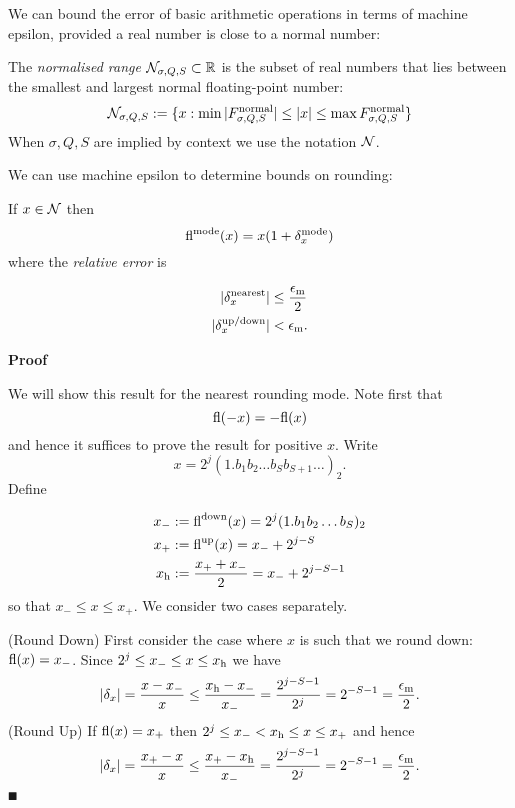 We can bound the error of basic arithmetic operations in terms of machine epsilon, provided a real number is close to a normal number:

\begin{definition} The \emph{normalised range} ${\cal N}_{\sigma,Q,S} \subset {\mathbb R}$ is the subset of real numbers that lies between the smallest and largest normal floating-point number:
\[
{\cal N}_{\ensuremath{\sigma},Q,S} := \{x : \min |F_{\ensuremath{\sigma},Q,S}^{\rm normal}| \ensuremath{\leq} |x| \ensuremath{\leq} \max F_{\ensuremath{\sigma},Q,S}^{\rm normal} \}
\]
When $\ensuremath{\sigma},Q,S$ are implied by context we use the notation ${\cal N}$. \end{definition}

We can use machine epsilon to determine bounds on rounding:

\begin{proposition} If $x \in {\cal N}$ then
\[
{\rm fl}^{\rm mode}(x) = x (1 + \ensuremath{\delta}_x^{\rm mode})
\]
where the \emph{relative error} is


\begin{align*}
|\ensuremath{\delta}_x^{\rm nearest}| &\ensuremath{\leq} {\ensuremath{\epsilon}_{\rm m} \over 2} \\
|\ensuremath{\delta}_x^{\rm up/down}| &< {\ensuremath{\epsilon}_{\rm m}}.
\end{align*}
\end{proposition}
\textbf{Proof}

We will show this result for the nearest rounding mode. Note first that
\[
{\rm fl}(-x) = -{\rm fl}(x)
\]
and hence it suffices to prove the result for positive $x$. Write
\[
x = 2^j (1.b_1b_2\ensuremath{\ldots}b_Sb_{S+1} \ensuremath{\ldots})_2.
\]
Define


\begin{align*}
x_- &:= {\rm fl}^{\rm down}(x) = 2^j (1.b_1b_2\ensuremath{\ldots}b_S)_2 \\
x_+ &:= {\rm fl}^{\rm up}(x) = x_- + 2^{j-S} \\
x_{\rm h} &:= {x_+ + x_- \over 2} = x_- + 2^{j-S-1}
\end{align*}
so that $x_- \ensuremath{\leq} x \ensuremath{\leq} x_+$. We consider two cases separately. 

(Round Down) First consider the case where $x$ is such that we round down: ${\rm fl}(x) = x_-$. Since $2^j \ensuremath{\leq} x_- \ensuremath{\leq} x \ensuremath{\leq} x_{\rm h}$ we have
\[
|\ensuremath{\delta}_x| = {x - x_- \over x} \ensuremath{\leq} {x_{\rm h} - x_- \over x_-} = {2^{j-S-1} \over 2^j} = 2^{-S-1} = {\ensuremath{\epsilon}_{\rm m} \over 2}.
\]
(Round Up) If ${\rm fl}(x) = x_+$ then $2^j \ensuremath{\leq} x_- < x_{\rm h} \ensuremath{\leq} x \ensuremath{\leq} x_+$ and hence
\[
|\ensuremath{\delta}_x| = {x_+ - x \over x} \ensuremath{\leq} {x_+ - x_{\rm h} \over x_-} = {2^{j-S-1} \over 2^j} = 2^{-S-1} = {\ensuremath{\epsilon}_{\rm m} \over 2}.
\]
\ensuremath{\QED}

